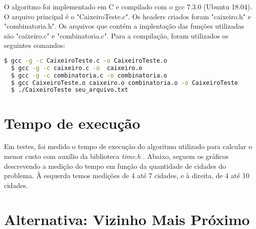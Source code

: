 \documentclass[a4paper, 12pt]{article} %
\begin{document}
		O algoritmo foi implementado em C e compilado com o gcc 7.3.0 (Ubuntu 18.04).	O arquivo principal é o "CaixeiroTeste.c". Os headers criados foram "caixeiro.h" e "combinatoria.h". Os arquivos que contém a implentação das funções utilizadas são "caixeiro.c" e "combinatoria.c". Para a compilação, foram utilizados os seguintes comandos:
		
	\begin{lstlisting}[language=bash]
  $ gcc -g -c CaixeiroTeste.c -o CaixeiroTeste.o
  $ gcc -g -c caixeiro.c -o  caixeiro.o
  $ gcc -g -c combinatoria.c -o combinatoria.o
  $ gcc CaixeiroTeste.o caixeiro.o combinatoria.o -o CaixeiroTeste
  $ ./CaixeiroTeste seu_arquivo.txt
	\end{lstlisting}
		
	\section{Tempo de execução}
	
	Em testes, foi medido o tempo de execução do algoritmo utilizado para calcular o menor custo com auxílio da biblioteca \textit{time.h} . Abaixo, seguem os gráficos descrevendo a medição do tempo em função da quantidade de cidades do problema. À esquerda temos medições de 4 até 7 cidades, e à direita, de 4 até 10 cidades.
	
\begin{flushleft}	
	
	\end{flushleft}
	
	\section{Alternativa: Vizinho Mais Próximo}
	
\end{document}
